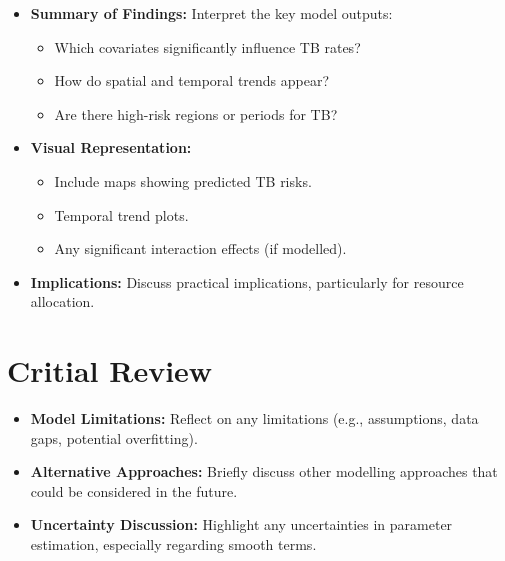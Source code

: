 \documentclass[
  11pt,
  a4paper,11pt]{article}
\providecommand{\tightlist}{%
  \setlength{\itemsep}{0pt}\setlength{\parskip}{0pt}}
\begin{document}
\begin{itemize}
\item
  \textbf{Summary of Findings:} Interpret the key model outputs:

  \begin{itemize}
  \item
    Which covariates significantly influence TB rates?
  \item
    How do spatial and temporal trends appear?
  \item
    Are there high-risk regions or periods for TB?
  \end{itemize}
\end{itemize}

\begin{itemize}
\item
  \textbf{Visual Representation:}

  \begin{itemize}
  \item
    Include maps showing predicted TB risks.
  \item
    Temporal trend plots.
  \item
    Any significant interaction effects (if modelled).
  \end{itemize}
\end{itemize}

\begin{itemize}
\tightlist
\item
  \textbf{Implications:} Discuss practical implications, particularly
  for resource allocation.
\end{itemize}

\section{Critial Review}\label{critial-review}

\begin{itemize}
\tightlist
\item
  \textbf{Model Limitations:} Reflect on any limitations (e.g.,
  assumptions, data gaps, potential overfitting).
\end{itemize}

\begin{itemize}
\tightlist
\item
  \textbf{Alternative Approaches:} Briefly discuss other modelling
  approaches that could be considered in the future.
\end{itemize}

\begin{itemize}
\tightlist
\item
  \textbf{Uncertainty Discussion:} Highlight any uncertainties in
  parameter estimation, especially regarding smooth terms.
\end{itemize}
\end{document}
